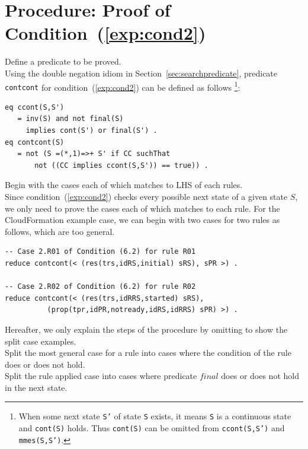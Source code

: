 \documentclass[12pt]{report}
\newcommand{\stt}[1]{{\small{\tt {#1}}}}
\begin{document}
\section{Procedure: Proof of Condition~(\ref{exp:cond2})}
\label{sec:contcont}
 Define a predicate to be proved. \\ Using the
double negation idiom in Section~\ref{sec:searchpredicate}, predicate
{\tt contcont} for condition~(\ref{exp:cond2}) can be defined as follows
\footnote{When some next state {\tt S'} of state {\tt S} exists, it
  means {\tt S} is a continuous state and \stt{cont(S)} holds. Thus
  \stt{cont(S)} can be omitted from \stt{ccont(S,S')} and
  \stt{mmes(S,S')}.}:
\begin{verbatim}
eq ccont(S,S')
   = inv(S) and not final(S) 
     implies cont(S') or final(S') .
eq contcont(S)
   = not (S =(*,1)=>+ S' if CC suchThat
       not ((CC implies ccont(S,S')) == true)) .
\end{verbatim}
 Begin with the cases each of which matches to
LHS of each rules. \\ Since condition~(\ref{exp:cond2}) checks every
possible next state of a given state $S$, we only need to prove the
cases each of which matches to each rule. For the CloudFormation
example case, we can begin with two cases for two rules as follows,
which are too general.
\begin{verbatim}
-- Case 2.R01 of Condition (6.2) for rule R01
reduce contcont(< (res(trs,idRS,initial) sRS), sPR >) .

-- Case 2.R02 of Condition (6.2) for rule R02
reduce contcont(< (res(trs,idRRS,started) sRS), 
          (prop(tpr,idPR,notready,idRS,idRRS) sPR) >) .
\end{verbatim}

Hereafter, we only explain the steps of the procedure by omitting to show
the split case examples. \\

 Split the most general case for a rule into
cases where the condition of the rule does or does not hold. \\

 Split the rule applied case into cases
where predicate $final$ does or does not hold in the next state.\\
\end{document}
